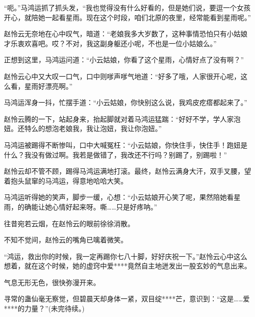\begin{this_body}
“呃。”马鸿运抓了抓头发，“我也觉得没有什么好看的，但是她们说，要逗一个女孩开心，就陪她一起看星雨。现在这个时段，咱们北原的夜里，经常能看到星雨呢。”

赵怜云无奈地在心中叹气，暗道：“老娘我多大岁数了，这种事情恐怕只有小姑娘才乐衷欢喜吧。哎？不对，我这副身躯还小呢，不也是一位小姑娘么。”

正想到这里，马鸿运问道：“小云姑娘，你看了这个星雨，心情好点了没有啊？”

赵怜云心中又大叹一口气，口中则嗲声嗲气地道：“好多了哦，人家很开心呢，这么看，星雨好漂亮啊。”

马鸿运浑身一抖，忙摆手道：“小云姑娘，你快别这么说，我鸡皮疙瘩都起来了。”

赵怜云腾的一下，站起身来，抬起脚就对着马鸿运猛踹：“好好不学，学人家泡妞。还特么的想泡老娘我，我让泡妞，我让你泡妞。”

马鸿运被踢得不断惨叫，口中大喊冤枉：“小云姑娘，你快住手，快住手！跑妞是什么？我没有做过啊。我若是做错了，我改还不行吗？别踢了，别踢啦！”

赵怜云却不管不顾，踢得马鸿运满地打滚。最终，赵怜云满身大汗，双手叉腰，望着抱头鼠窜的马鸿运，得意地哈哈大笑。

马鸿运听得她的笑声，脚步一缓，心想：“小云姑娘开心笑了呢，果然陪她看星雨，的确能让她心情好起来呀。嘶……只是好疼呐。”

往昔宛若云烟，在赵怜云的眼前徐徐消散。

不知不觉间，赵怜云的嘴角已噙着微笑。

“鸿运，救出你的时候，我一定再踢你七八十脚，好好庆祝一下。”赵怜云心中这么想着，就在这个时候，她的虚窍中爱****竟然自主地迸发出一股玄妙的气息出来。

气息无形无色，很快弥漫开来。

寻常的蛊仙毫无察觉，但碧晨天却身体一紧，双目绽****芒，意识到：“这是……爱****的力量？”(未完待续。)

\end{this_body}

